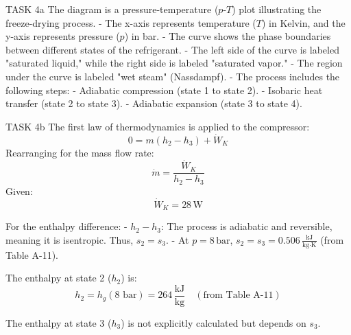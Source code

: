 TASK 4a  
The diagram is a pressure-temperature (\( p \)-\( T \)) plot illustrating the freeze-drying process.  
- The x-axis represents temperature (\( T \)) in Kelvin, and the y-axis represents pressure (\( p \)) in bar.  
- The curve shows the phase boundaries between different states of the refrigerant.  
- The left side of the curve is labeled "saturated liquid," while the right side is labeled "saturated vapor."  
- The region under the curve is labeled "wet steam" (Nassdampf).  
- The process includes the following steps:  
  - Adiabatic compression (state 1 to state 2).  
  - Isobaric heat transfer (state 2 to state 3).  
  - Adiabatic expansion (state 3 to state 4).  

TASK 4b  
The first law of thermodynamics is applied to the compressor:  
\[
0 = m (h_2 - h_3) + \dot{W}_K
\]  
Rearranging for the mass flow rate:  
\[
\dot{m} = \frac{\dot{W}_K}{h_2 - h_3}
\]  
Given:  
\[
\dot{W}_K = 28 \, \text{W}
\]  

For the enthalpy difference:  
- \( h_2 - h_3 \): The process is adiabatic and reversible, meaning it is isentropic. Thus, \( s_2 = s_3 \).  
- At \( p = 8 \, \text{bar} \), \( s_2 = s_3 = 0.506 \, \frac{\text{kJ}}{\text{kg·K}} \) (from Table A-11).  

The enthalpy at state 2 (\( h_2 \)) is:  
\[
h_2 = h_g(\text{8 bar}) = 264 \, \frac{\text{kJ}}{\text{kg}} \quad (\text{from Table A-11})
\]  

The enthalpy at state 3 (\( h_3 \)) is not explicitly calculated but depends on \( s_3 \).